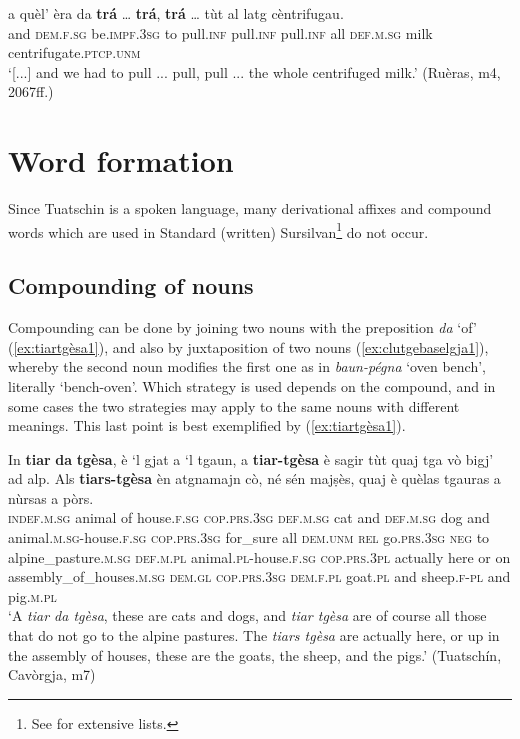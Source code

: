 \ea
\label{ex:rep2}
\gll [...] a quèl’ èra da \textbf{trá} … \textbf{trá}, \textbf{trá} … tùt al latg cèntrifugau.\\
{} and \textsc{dem.f.sg} be.\textsc{impf.3sg} to pull.\textsc{inf} {} pull.\textsc{inf} pull.\textsc{inf} {} all \textsc{def.m.sg} milk centrifugate.\textsc{ptcp.unm}    \\
\glt `[...] and we had to pull ... pull, pull ... the whole centrifuged milk.' (Ruèras, m4, 2067ff.)
\z

\section{Word formation}
Since Tuatschin is a spoken language, many derivational affixes and compound words which are used in Standard (written) Sursilvan\footnote{See \citep[163-194]{Spescha1989} for extensive lists.} do not occur.

\subsection{Compounding of nouns}
Compounding can be done by joining two nouns with the preposition \textit{da} `of' (\ref{ex:tiartgèsa1}), and also by juxtaposition of two nouns (\ref{ex:clutgebaselgja1}), whereby the second noun modifies the first one as in \textit{baun-pégna} `oven bench', literally `bench-oven'. Which strategy is used depends on the compound, and in some cases the two strategies may apply to the same nouns with different meanings. This last point is best exemplified by (\ref{ex:tiartgèsa1}).

\ea\label{ex:tiartgèsa1}
\gll  In \textbf{tiar} \textbf{da} \textbf{tgèsa}, è `l gjat a `l tgaun, a \textbf{tiar-tgèsa} è sagir tùt quaj tga vò bigj’ ad alp. Als \textbf{tiars-tgèsa} èn atgnamajn cò, né sén majṣès, quaj è quèlas tgauras a nùrsas a pòrs.  \\
\textsc{indef.m.sg} animal of house.\textsc{f.sg} \textsc{cop.prs.3sg} \textsc{def.m.sg} cat and \textsc{def.m.sg} dog  and animal.\textsc{m.sg}-house.\textsc{f.sg} \textsc{cop.prs.3sg} for\_sure all \textsc{dem.unm} \textsc{rel} go.\textsc{prs.3sg} \textsc{neg} to alpine\_pasture.\textsc{m.sg} \textsc{def.m.pl} animal.\textsc{pl}-house.\textsc{f.sg} \textsc{cop.prs.3pl} actually here or on assembly\_of\_houses.\textsc{m.sg} \textsc{dem.gl} \textsc{cop.prs.3sg} \textsc{dem.f.pl} goat.\textsc{pl} and sheep.\textsc{f-pl} and pig.\textsc{m.pl}\\
\glt `A \textit{tiar da tgèsa}, these are cats and dogs, and \textit{tiar tgèsa} are of course all those that do not go to the alpine pastures. The \textit{tiars tgèsa} are actually here, or up in the assembly of houses, these are the goats, the sheep, and the pigs.' (Tuatschín, Cavòrgja, m7)
\z

